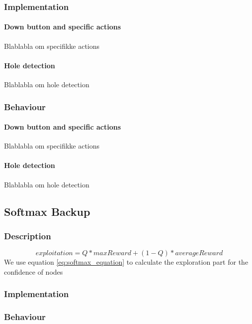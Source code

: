 \documentclass[10pt,a4paper]{article}
\begin{document}
\subsubsection{Implementation}

\paragraph{Down button and specific actions}
Blablabla om specifikke actions
\paragraph{Hole detection}
Blablabla om hole detection

\subsubsection{Behaviour}

\paragraph{Down button and specific actions}
Blablabla om specifikke actions
\paragraph{Hole detection}
Blablabla om hole detection

\subsection{Softmax Backup}
\subsubsection{Description}
\begin{equation}\label{eq:softmax_equation}
exploitation = Q * maxReward + (1 - Q ) * averageReward
\end{equation}
We use equation \ref{eq:softmax_equation} to calculate the exploration part for the confidence of nodes

\subsubsection{Implementation}

\subsubsection{Behaviour}
\end{document}
